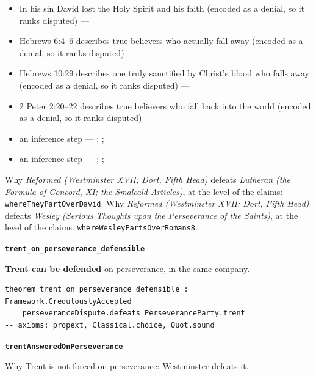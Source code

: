 \documentclass[11pt]{article}
\begin{document}
\begin{itemize}
\begin{itemize}
\item In his sin David lost the Holy Spirit and his faith (encoded as a denial, so it ranks disputed) --- \cite[299--300]{calvin-psalms-2-1846}
\item Hebrews 6:4–6 describes true believers who actually fall away (encoded as a denial, so it ranks disputed) --- \cite[137--138]{calvin-hebrews-1853}
\item Hebrews 10:29 describes one truly sanctified by Christ’s blood who falls away (encoded as a denial, so it ranks disputed) --- \cite[545--546]{owen-works-23-1855}
\item 2 Peter 2:20–22 describes true believers who fall back into the world (encoded as a denial, so it ranks disputed) --- \cite[410--412]{calvin-commentaries-catholic-epistles}
\item an inference step --- \cite[444--445]{wesley-works-9-1827}; \cite[415--416]{calvin-commentary-john-1847}; \cite[Solid Declaration XI.45]{concordia-triglotta-1921}
\item an inference step --- \cite[Trent, Session VI (1547), ch. 13]{tanner-decrees-1990}; \cite[40]{waterworth-trent-1848}; \cite[Solid Declaration XI.42]{concordia-triglotta-1921}
\end{itemize}
\end{itemize}
\noindent Why \emph{Reformed (Westminster XVII; Dort, Fifth Head)} defeats \emph{Lutheran (the Formula of Concord, XI; the Smalcald Articles)}, at the level of the claims: \texttt{where\allowbreak{}They\allowbreak{}Part\allowbreak{}Over\allowbreak{}David}.
\noindent Why \emph{Reformed (Westminster XVII; Dort, Fifth Head)} defeats \emph{Wesley (Serious Thoughts upon the Perseverance of the Saints)}, at the level of the claims: \texttt{where\allowbreak{}Wesley\allowbreak{}Parts\allowbreak{}Over\allowbreak{}Romans8}.
\par\medskip\noindent\textbf{\texttt{trent\_\allowbreak{}on\_\allowbreak{}perseverance\_\allowbreak{}defensible}}\par\nobreak\noindent
\textbf{Trent can be defended} on perseverance, in the same company.

{\small\begin{verbatim}
theorem trent_on_perseverance_defensible : Framework.CredulouslyAccepted
    perseveranceDispute.defeats PerseveranceParty.trent
-- axioms: propext, Classical.choice, Quot.sound
\end{verbatim}}
\par\medskip\noindent\textbf{\texttt{trent\allowbreak{}Answered\allowbreak{}On\allowbreak{}Perseverance}}\par\nobreak\noindent
Why Trent is not forced on perseverance: Westminster defeats it.
\end{document}
